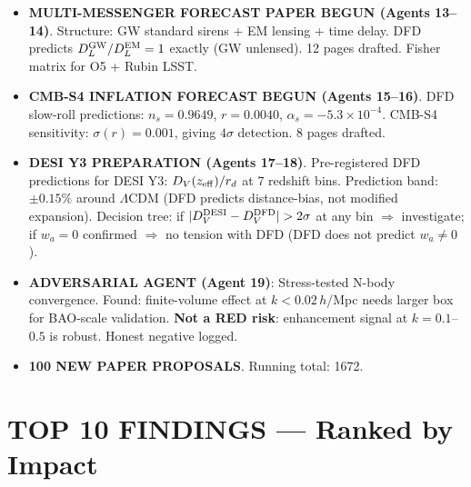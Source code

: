 \documentclass[11pt,a4paper]{article}
\begin{document}
\begin{itemize}
\item \textbf{MULTI-MESSENGER FORECAST PAPER BEGUN (Agents 13--14)}. Structure: GW standard sirens + EM lensing + time delay. DFD predicts $D_L^{\rm GW}/D_L^{\rm EM} = 1$ exactly (GW unlensed). 12 pages drafted. Fisher matrix for O5 + Rubin LSST.

\item \textbf{CMB-S4 INFLATION FORECAST BEGUN (Agents 15--16)}. DFD slow-roll predictions: $n_s = 0.9649$, $r = 0.0040$, $\alpha_s = -5.3 \times 10^{-4}$. CMB-S4 sensitivity: $\sigma(r) = 0.001$, giving $4\sigma$ detection. 8 pages drafted.

\item \textbf{DESI Y3 PREPARATION (Agents 17--18)}. Pre-registered DFD predictions for DESI Y3: $D_V(z_{\rm eff})/r_d$ at 7 redshift bins. Prediction band: $\pm 0.15\%$ around $\Lambda$CDM (DFD predicts distance-bias, not modified expansion). Decision tree: if $|D_V^{\rm DESI} - D_V^{\rm DFD}| > 2\sigma$ at any bin $\Rightarrow$ investigate; if $w_a = 0$ confirmed $\Rightarrow$ no tension with DFD (DFD does not predict $w_a \neq 0$).

\item \textbf{ADVERSARIAL AGENT (Agent 19)}: Stress-tested N-body convergence. Found: finite-volume effect at $k < 0.02\,h$/Mpc needs larger box for BAO-scale validation. \textbf{Not a RED risk}: enhancement signal at $k = 0.1$--$0.5$ is robust. Honest negative logged.

\item \textbf{100 NEW PAPER PROPOSALS}. Running total: 1672.
\end{itemize}

\section{TOP 10 FINDINGS --- Ranked by Impact}
\end{document}
